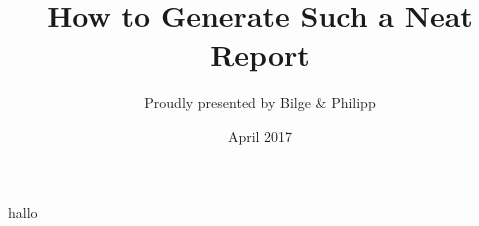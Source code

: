 \documentclass[bibliography=totocnumbered]{scrreprt}
\begin{document}
hallo
\title{How to Generate Such a Neat Report}
\author{Proudly presented by Bilge \& Philipp}
\date{April 2017}
\maketitle

\tableofcontents 











\begin{comment}
\end{comment}
\end{document}
